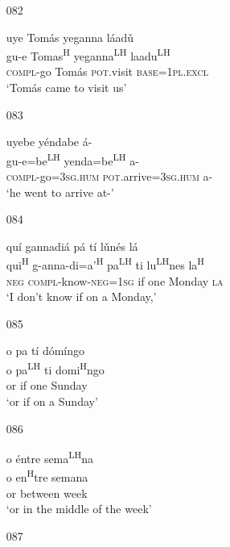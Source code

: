 \begin{itemize}
\item[082]
 
\glll   uye Tom\'{a}s yeganna l\'{a}ad\v{u}\\
gu-e Tomas\textsuperscript{H} yeganna\textsuperscript{LH} laadu\textsuperscript{LH}\\
\textsc{compl}-go Tom\'{a}s \textsc{pot}.visit \textsc{base}=\textsc{1pl.excl}\\
\glt `Tom\'{a}s came to visit us'
 


\item[083]
 
\glll   uyebe y\'{e}ndabe \'{a}- \\
 gu-e=be\textsuperscript{LH} yenda=be\textsuperscript{LH} a- \\
\textsc{compl}-go=\textsc{3sg.hum} \textsc{pot}.arrive=\textsc{3sg.hum} a-\\
\glt `he went to arrive at-'
 


\item[084]
 
\glll   qu\'{i} gannadi\'{a} p\'{a} t\'{i} l\v{u}n\'{e}s l\'{a}\\
qui\textsuperscript{H} g-anna-di=a'\textsuperscript{H} pa\textsuperscript{LH} ti lu\textsuperscript{LH}nes la\textsuperscript{H}\\
\textsc{neg} \textsc{compl}-know-\textsc{neg}=\textsc{1sg} if one Monday \textsc{la}\\
\glt `I don't know if on a Monday,'
 


\item[085]
 
\glll   o pa t\'{i} d\'{o}m\'{i}ngo\\
o pa\textsuperscript{LH} ti domi\textsuperscript{H}ngo \\
or if one Sunday\\
\glt `or if on a Sunday' 
 


\item[086]
 
\glll   o \'{e}ntre sema\textsuperscript{LH}na\\
o en\textsuperscript{H}tre semana\\
or between week\\
\glt `or in the middle of the week'
 


\item[087]
 

\end{itemize}
